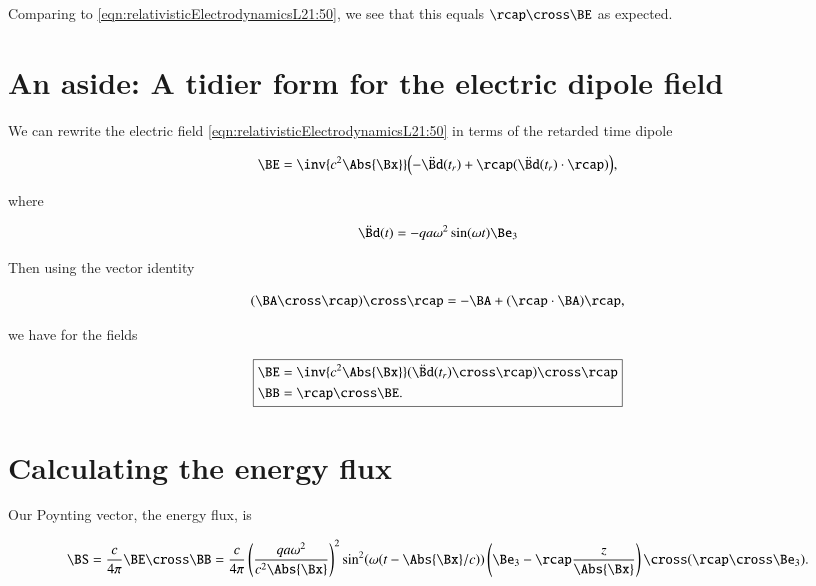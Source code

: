 Comparing to \ref{eqn:relativisticElectrodynamicsL21:50}, we see that this equals $\rcap \cross \BE$ as expected.

\section{An aside: A tidier form for the electric dipole field}

We can rewrite the electric field \ref{eqn:relativisticElectrodynamicsL21:50} in terms of the retarded time dipole

\begin{equation}\label{eqn:relativisticElectrodynamicsL21:80}
\BE = \inv{c^2 \Abs{\Bx}} \Bigl( -\ddot{\Bd}(t_r) + \rcap ( \ddot{\Bd}(t_r) \cdot \rcap ) \Bigr),
\end{equation}

where

\begin{equation}\label{eqn:relativisticElectrodynamicsL21:100}
\ddot{\Bd}(t) = - q a \omega^2 \sin(\omega t) \Be_3
\end{equation}

Then using the vector identity

\begin{equation}\label{eqn:relativisticElectrodynamicsL21:120}
(\BA \cross \rcap ) \cross \rcap = -\BA + (\rcap \cdot \BA) \rcap,
\end{equation}

we have for the fields

\begin{equation}\label{eqn:relativisticElectrodynamicsL21:140}
\boxed{
\begin{aligned}
\BE &= \inv{c^2 \Abs{\Bx}} (\ddot{\Bd}(t_r) \cross \rcap) \cross \rcap \\
\BB &= \rcap \cross \BE.
\end{aligned}
}
\end{equation}


\section{Calculating the energy flux}

Our Poynting vector, the energy flux, is

\begin{equation}\label{eqn:relativisticElectrodynamicsL21:160}
\BS = \frac{c}{4 \pi} \BE \cross \BB =
\frac{c}{4 \pi}
\left( \frac{q a \omega^2}{c^2 \Abs{\Bx} } \right)^2
\sin^2(\omega (t - \Abs{\Bx}/c))
\left( \Be_3 - \rcap \frac{z}{\Abs{\Bx}} \right) \cross (\rcap \cross \Be_3).
\end{equation}


